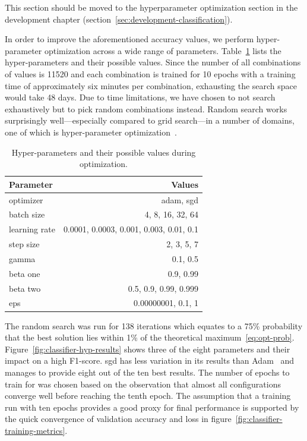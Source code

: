 \documentclass[draft,final]{vutinfth} %
\begin{document}
This section should be moved to the hyperparameter optimization
section in the development chapter
(section~\ref{sec:development-classification}).

In order to improve the aforementioned accuracy values, we perform
hyper-parameter optimization across a wide range of
parameters. Table~\ref{tab:classifier-hyps} lists the hyper-parameters
and their possible values. Since the number of all combinations of
values is 11520 and each combination is trained for 10 epochs with a
training time of approximately six minutes per combination, exhausting
the search space would take 48 days. Due to time limitations, we have
chosen to not search exhaustively but to pick random combinations
instead. Random search works surprisingly well---especially compared to
grid search---in a number of domains, one of which is hyper-parameter
optimization~\cite{bergstra2012}.

\begin{table}[h]
  \centering
  \begin{tabular}{lr}
    \toprule
    Parameter &  Values \\
    \midrule
    optimizer &	adam, sgd \\
    batch size & 4, 8, 16, 32, 64 \\
    learning rate & 0.0001, 0.0003, 0.001, 0.003, 0.01, 0.1 \\
    step size & 2, 3, 5, 7 \\
    gamma & 0.1, 0.5 \\
    beta one & 0.9, 0.99 \\
    beta two & 0.5, 0.9, 0.99, 0.999 \\
    eps & 0.00000001, 0.1, 1 \\
    \bottomrule
  \end{tabular}
  \caption{Hyper-parameters and their possible values during
    optimization.}
  \label{tab:classifier-hyps}
\end{table}

The random search was run for 138 iterations which equates to a 75\%
probability that the best solution lies within 1\% of the theoretical
maximum~\eqref{eq:opt-prob}. Figure~\ref{fig:classifier-hyp-results}
shows three of the eight parameters and their impact on a high
F1-score. \gls{sgd} has less variation in its results than
Adam~\cite{kingma2017} and manages to provide eight out of the ten
best results. The number of epochs to train for was chosen based on
the observation that almost all configurations converge well before
reaching the tenth epoch. The assumption that a training run with ten
epochs provides a good proxy for final performance is supported by the
quick convergence of validation accuracy and loss in
figure~\ref{fig:classifier-training-metrics}.
\end{document}
